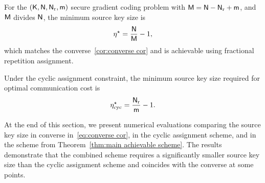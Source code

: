 \documentclass[conference,letterpaper]{IEEEtran}
\begin{document}
 
\begin{rem}
\label{rem:extreme cases}
\em

For the $({\sf K},{\sf N},{\sf N}_{\rm r}, {\sf m})$ secure gradient coding problem with  ${\sf M}= {\sf N} - {\sf N}_{\rm r} + {\sf m}$, and ${\sf M}$ divides ${\sf N}$, the minimum source key size is
\begin{align}
    \eta^{\star} = \frac{{\sf N}}{{\sf M}} - 1, \label{eq:gradient eta rho rep}
\end{align}
which matches the converse~\eqref{cor:converse cor} and is achievable using fractional repetition assignment.

Under the cyclic assignment constraint, the minimum source key size required for optimal communication cost is
\begin{align}
    \eta^{\star}_{\text{cyc}} = \frac{{\sf N}_{\rm r}}{{\sf m}} - 1. \label{eq:gradient eta cyc}
\end{align}


\end{rem}

At the end of this section, we present numerical evaluations comparing the source key size in converse in~\eqref{eq:converse cor}, in the cyclic assignment scheme, and in the scheme from Theorem~\ref{thm:main achievable scheme}. %
The results demonstrate that the combined scheme requires a significantly smaller source key size than the cyclic assignment scheme and coincides with the converse at some points.
\end{document}
